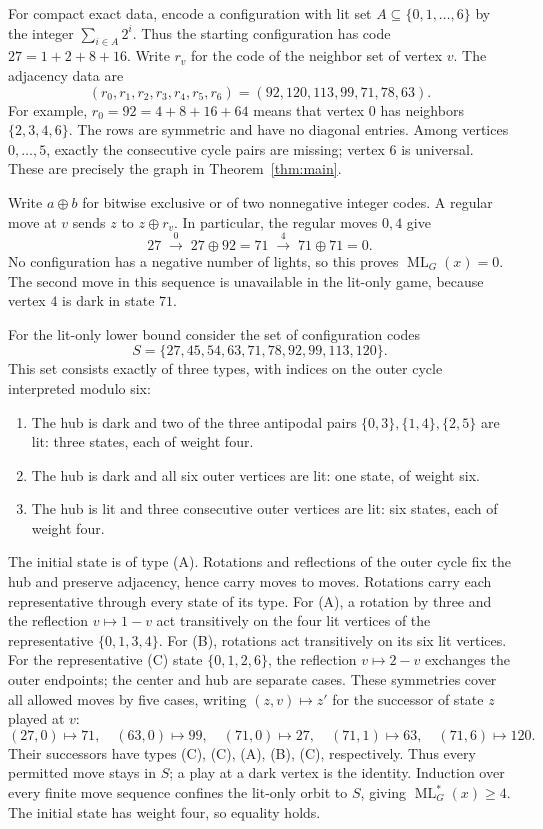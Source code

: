 \documentclass[11pt]{article}
\newcommand{\ML}{\operatorname{ML}}
\begin{document}
For compact exact data, encode a configuration with lit set
$A\subseteq\{0,1,\ldots,6\}$ by the integer $\sum_{i\in A}2^i$.
Thus the starting configuration has code $27=1+2+8+16$.
Write $r_v$ for the code of the neighbor set of vertex $v$.
The adjacency data are
\begin{equation}\label{eq:rows}
 (r_0,r_1,r_2,r_3,r_4,r_5,r_6)
 =(92,120,113,99,71,78,63).
\end{equation}
For example, $r_0=92=4+8+16+64$ means that vertex $0$ has neighbors
$\{2,3,4,6\}$. The rows are symmetric and have no diagonal entries.
Among vertices $0,\ldots,5$, exactly the consecutive cycle pairs are
missing; vertex $6$ is universal. These are precisely the graph in
Theorem~\ref{thm:main}.

Write $a\oplus b$ for bitwise exclusive or of two nonnegative integer
codes. A regular move at $v$ sends $z$ to $z\oplus r_v$.
In particular, the regular moves $0,4$ give
\[
 27\;\xrightarrow{\;0\;}\;27\oplus92=71
 \;\xrightarrow{\;4\;}\;71\oplus71=0.
\]
No configuration has a negative number of lights, so this proves
$\ML_G(x)=0$. The second move in this sequence is unavailable in the
lit-only game, because vertex $4$ is dark in state $71$.

For the lit-only lower bound consider the set of configuration codes
\begin{equation}\label{eq:closed}
 S=\{27,45,54,63,71,78,92,99,113,120\}.
\end{equation}
This set consists exactly of three types, with indices on the outer
cycle interpreted modulo six:
\begin{enumerate}
\item[(A)] The hub is dark and two of the three antipodal pairs
$\{0,3\},\{1,4\},\{2,5\}$ are lit: three states, each of weight four.
\item[(B)] The hub is dark and all six outer vertices are lit: one state,
of weight six.
\item[(C)] The hub is lit and three consecutive outer vertices are lit:
six states, each of weight four.
\end{enumerate}
The initial state is of type (A). Rotations and reflections of the outer
cycle fix the hub and preserve adjacency, hence carry moves to moves.
Rotations carry each representative through every state of its type.
For (A), a rotation by three and the reflection $v\mapsto1-v$ act
transitively on the four lit vertices of the representative
$\{0,1,3,4\}$. For (B), rotations act transitively on its six lit vertices.
For the representative (C) state $\{0,1,2,6\}$, the reflection
$v\mapsto2-v$ exchanges the outer endpoints; the center and hub are
separate cases. These symmetries cover all allowed moves by five cases,
writing $(z,v)\mapsto z'$ for the successor of state $z$ played at $v$:
\[
 (27,0)\mapsto71,\quad (63,0)\mapsto99,\quad
 (71,0)\mapsto27,\quad (71,1)\mapsto63,\quad
 (71,6)\mapsto120.
\]
Their successors have types (C), (C), (A), (B), (C), respectively.
Thus every permitted move stays in $S$; a play at a dark vertex is the
identity. Induction over every finite move sequence confines the
lit-only orbit to $S$, giving $\ML_G^*(x)\geq4$. The initial state has
weight four, so equality holds.
\end{document}

